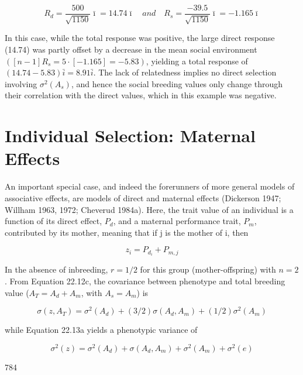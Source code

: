 \documentclass{article}
\begin{document}
\begin{equation}
R_{d}=\frac{500}{\sqrt{1150}}\bar{\imath}=14.74\bar{\imath}\quad and\quad R_{s}=\frac{-39.5}{\sqrt{1150}}\bar{\imath}=-1.165\bar{\imath}
\end{equation}

In this case, while the total response was positive, the large direct response (14.74) was partly offset by a decrease in the mean social environment  $ ([n-1]R_s = 5 \cdot [-1.165] = -5.83) $, yielding a total response of  $ (14.74 - 5.83) \bar{i} = 8.91 \bar{i} $. The lack of relatedness implies no direct selection involving  $ \sigma^2(A_s) $, and hence the social breeding values only change through their correlation with the direct values, which in this example was negative.

\section{Individual Selection: Maternal Effects}
An important special case, and indeed the forerunners of more general models of associative effects, are models of direct and maternal effects (Dickerson 1947; Willham 1963, 1972; Cheverud 1984a). Here, the trait value of an individual is a function of its direct effect,  $ P_{d} $, and a maternal performance trait,  $ P_{m} $, contributed by its mother, meaning that if j is the mother of i, then

\begin{equation}
z_{i}=P_{d_{i}}+P_{m,j}
\tag{22.16a}
\label{eq:22_16a}
\end{equation}

In the absence of inbreeding, $r = 1/2$ for this group (mother-offspring) with $n = 2$. From Equation 22.12c, the covariance between phenotype and total breeding value ($A_T = A_d + A_m$, with $A_s = A_m$) is

\begin{equation}
\sigma(z,A_{T})=\sigma^{2}(A_{d})+(3/2)\sigma(A_{d},A_{m})+(1/2)\sigma^{2}\left(A_{m}\right)
\tag{22.16b}
\label{eq:22_16b}
\end{equation}

while Equation 22.13a yields a phenotypic variance of

\begin{equation}
\sigma^{2}(z)=\sigma^{2}(A_{d})+\sigma(A_{d},A_{m})+\sigma^{2}(A_{m})+\sigma^{2}(e)
\tag{22.16c}
\label{eq:22_16c}
\end{equation}

784
\end{document}
